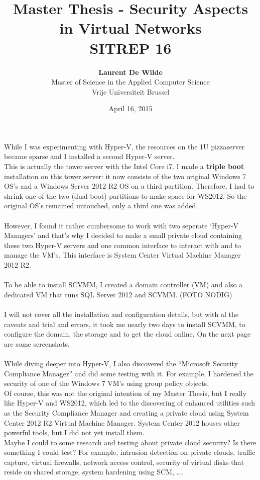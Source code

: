 \documentclass[11pt, a4paper]{article}
\title{Master Thesis -  Security Aspects in Virtual Networks\\ \textbf{SITREP 16}}
\author{\textbf{Laurent De Wilde} \\ Master of Science in the Applied Computer Science \\ Vrije Universiteit Brussel}
\date{April 16, 2015}
\begin{document}
\maketitle

While I was experimenting with Hyper-V, the resources on the 1U pizzaserver became sparse and I installed a second Hyper-V server. \\
This is actually the tower server with the Intel Core i7. I made a \textbf{triple boot} installation on this tower server: it now consists of the two original Windows 7 OS's and a Windows Server 2012 R2 OS on a third partition. Therefore, I had to shrink one of the two (dual boot) partitions to make space for WS2012. So the original OS's remained untouched, only a third one was added.\\ \\
However, I found it rather cumbersome to work with two seperate `Hyper-V Managers' and that's why I decided to make a small private cloud containing these two Hyper-V servers and one common interface to interact with and to manage the VM's. This interface is System Center Virtual Machine Manager 2012 R2. \\ \\
To be able to install SCVMM, I created a domain controller (VM) and also a dedicated VM that runs SQL Server 2012 and SCVMM. (FOTO NODIG) \\ \\
I will not cover all the installation and configuration details, but with al the caveats and trial and errors, it took me nearly two days to install SCVMM, to configure the domain, the storage and to get the cloud online. On the next page are some screenshots. \\ \\
While diving deeper into Hyper-V, I also discovered the ``Microsoft Security Compliance Manager'' and did some testing with it. For example, I hardened the security of one of the Windows 7 VM's using group policy objects. \\
Of course, this was not the original intention of my Master Thesis, but I really like Hyper-V and WS2012, which led to the discovering of enhanced utilities such as the Security Compliance Manager and creating a private cloud using System Center 2012 R2 Virtual Machine Manager. System Center 2012 houses other powerful tools, but I did not yet install them. \\
Maybe I could to some research and testing about private cloud security? Is there something I could test? For example, intrusion detection on private clouds, traffic capture, virtual firewalls, network access control, security of virtual disks that reside on shared storage, system hardening using SCM, \ldots.
\end{document}
